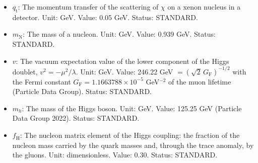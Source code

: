 \documentclass[
  10pt,
]{article}
\begin{document}
\begin{itemize}
  \(\Delta m_{32}^2\)); \(\Delta m^2\) without labels the difference of
  the two states of a resonance, \(m_2^2 - m_1^2\), multiplied by
  \(v_{\mathrm{loc}}^2/v^2\) where this differs from 1; \(m\) without a
  label the mass of a mode of a field of the bulk as the fold sees it,
  \(m^2 = \omega^2 - k^2\); for the W and Z bosons their complex pole
  mass, \(m^2 = m_0^2 - \mathrm{i}m_0\Gamma_{\mathrm{bulk}}\) to the
  leading order; in the relic abundance of the particles \(\chi\) their
  mass. Unit: GeV. Status: STANDARD.
\item
  \(q_{\mathrm{t}}\): The momentum transfer of the scattering of
  \(\chi\) on a xenon nucleus in a detector. Unit: GeV. Value: 0.05 GeV.
  Status: STANDARD.
\item
  \(m_{\mathrm{N}}\): The mass of a nucleon. Unit: GeV. Value: 0.939
  GeV. Status: STANDARD.
\item
  \(v\): The vacuum expectation value of the lower component of the
  Higgs doublet, \(v^2 = -\mu^2/\lambda\). Unit: GeV. Value: 246.22 GeV
  \(= (\sqrt2\,G_{\mathrm{F}})^{-1/2}\) with the Fermi constant
  \(G_{\mathrm{F}} = 1.1663788\times10^{-5}\) GeV\(^{-2}\) of the muon
  lifetime (Particle Data Group). Status: STANDARD.
\item
  \(m_h\): The mass of the Higgs boson. Unit: GeV. Value: 125.25 GeV
  (Particle Data Group 2022). Status: STANDARD.
\item
  \(f_{\mathrm{H}}\): The nucleon matrix element of the Higgs coupling:
  the fraction of the nucleon mass carried by the quark masses and,
  through the trace anomaly, by the gluons. Unit: dimensionless. Value:
  0.30. Status: STANDARD.
\end{itemize}
\end{document}
